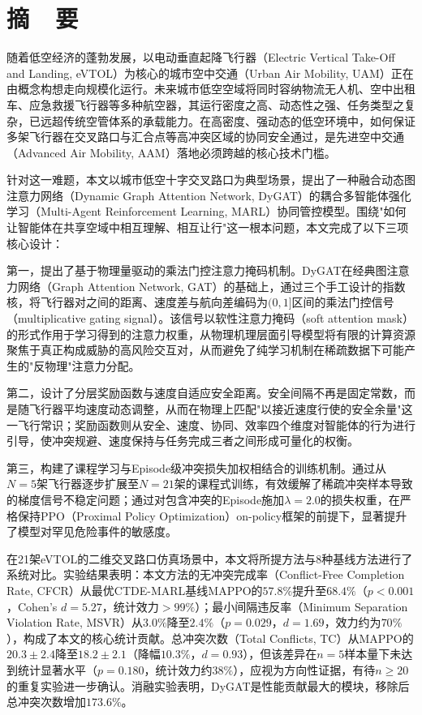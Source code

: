 \documentclass[12pt,a4paper,UTF8]{ctexbook}
\begin{document}
\chapter*{摘\ \ 要}

随着低空经济的蓬勃发展，以电动垂直起降飞行器（Electric Vertical Take-Off and Landing, eVTOL）为核心的城市空中交通（Urban Air Mobility, UAM）正在由概念构想走向规模化运行。未来城市低空空域将同时容纳物流无人机、空中出租车、应急救援飞行器等多种航空器，其运行密度之高、动态性之强、任务类型之复杂，已远超传统空管体系的承载能力。在高密度、强动态的低空环境中，如何保证多架飞行器在交叉路口与汇合点等高冲突区域的协同安全通过，是先进空中交通（Advanced Air Mobility, AAM）落地必须跨越的核心技术门槛。

针对这一难题，本文以城市低空十字交叉路口为典型场景，提出了一种融合动态图注意力网络（Dynamic Graph Attention Network, DyGAT）的耦合多智能体强化学习（Multi-Agent Reinforcement Learning, MARL）协同管控模型。围绕"如何让智能体在共享空域中相互理解、相互让行"这一根本问题，本文完成了以下三项核心设计：

第一，提出了基于物理量驱动的乘法门控注意力掩码机制。DyGAT在经典图注意力网络（Graph Attention Network, GAT）的基础上，通过三个手工设计的指数核，将飞行器对之间的距离、速度差与航向差编码为$(0,1]$区间的乘法门控信号（multiplicative gating signal）。该信号以软性注意力掩码（soft attention mask）的形式作用于学习得到的注意力权重，从物理机理层面引导模型将有限的计算资源聚焦于真正构成威胁的高风险交互对，从而避免了纯学习机制在稀疏数据下可能产生的"反物理"注意力分配。

第二，设计了分层奖励函数与速度自适应安全距离。安全间隔不再是固定常数，而是随飞行器平均速度动态调整，从而在物理上匹配"以接近速度行使的安全余量"这一飞行常识；奖励函数则从安全、速度、协同、效率四个维度对智能体的行为进行引导，使冲突规避、速度保持与任务完成三者之间形成可量化的权衡。

第三，构建了课程学习与Episode级冲突损失加权相结合的训练机制。通过从$N=5$架飞行器逐步扩展至$N=21$架的课程式训练，有效缓解了稀疏冲突样本导致的梯度信号不稳定问题；通过对包含冲突的Episode施加$\lambda=2.0$的损失权重，在严格保持PPO（Proximal Policy Optimization）on-policy框架的前提下，显著提升了模型对罕见危险事件的敏感度。

在21架eVTOL的二维交叉路口仿真场景中，本文将所提方法与8种基线方法进行了系统对比。实验结果表明：本文方法的无冲突完成率（Conflict-Free Completion Rate, CFCR）从最优CTDE-MARL基线MAPPO的$57.8\%$提升至$68.4\%$（$p<0.001$，Cohen's $d=5.27$，统计效力$>99\%$）；最小间隔违反率（Minimum Separation Violation Rate, MSVR）从$3.0\%$降至$2.4\%$（$p=0.029$，$d=1.69$，效力约为$70\%$），构成了本文的核心统计贡献。总冲突次数（Total Conflicts, TC）从MAPPO的$20.3\pm2.4$降至$18.2\pm2.1$（降幅$10.3\%$，$d=0.93$），但该差异在$n=5$样本量下未达到统计显著水平（$p=0.180$，统计效力约$38\%$），应视为方向性证据，有待$n\geq20$的重复实验进一步确认。消融实验表明，DyGAT是性能贡献最大的模块，移除后总冲突次数增加$173.6\%$。
\end{document}
